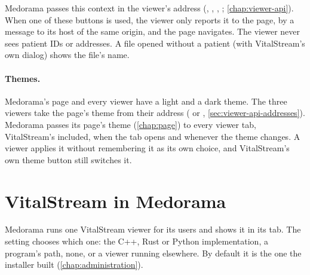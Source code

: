 Medorama passes this context in the viewer's address (, , ,
; \cref{chap:viewer-api}). When one of these buttons is used, the viewer only reports
it to the page, by a message to its host of the same origin, and the page navigates. The viewer
never sees patient IDs or addresses. A file opened without a patient (with VitalStream's own
 dialog) shows the file's name.

\paragraph{Themes.} Medorama's page and every viewer have a light and a dark theme. The three
viewers take the page's theme from their address ( or ,
\cref{sec:viewer-api-addresses}). Medorama passes its page's theme (\cref{chap:page}) to every
viewer tab, VitalStream's included, when the tab opens and whenever the theme changes. A viewer
applies it without remembering it as its own choice, and VitalStream's own theme button still
switches it.

\section{VitalStream in Medorama}
\label{sec:viewers-in-medorama-vitalstream}

Medorama runs one VitalStream viewer for its users and shows it in its  tab.
The setting  chooses which one: the C++, Rust or Python implementation, a program's
path, none, or a viewer running elsewhere. By default it is the one the installer built
(\cref{chap:administration}).

